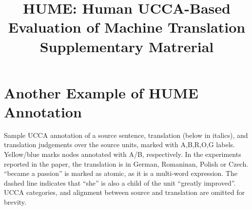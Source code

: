 \documentclass[11pt]{article}
\title{HUME: Human UCCA-Based Evaluation of Machine Translation \\
  Supplementary Matrerial}
\begin{document}
\maketitle

\section{Another Example of HUME Annotation}

Sample UCCA annotation of a source sentence, translation (below in italics), 
and translation judgements over the source units, marked with A,B,R,O,G labels. Yellow/blue marks nodes annotated with A/B, respectively.
In the experiments reported in the paper,
the translation is in German, Romaninan, Polish or Czech.
``became a passion'' is marked as atomic, as it is a multi-word expression.
The dashed line indicates that ``she'' is also a child of the unit ``greatly improved''.
UCCA categories, and alignment between source and translation are omitted for brevity.
\end{document}

